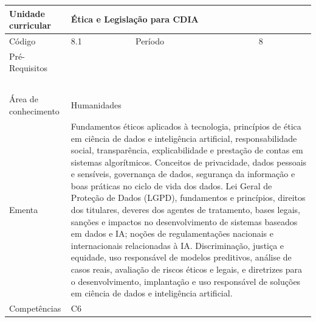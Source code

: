 \clearpage
\newpage

\begin{quadro}[ht!]
  \centering\scriptsize
\caption{Unidade Curricular Ética e Legislação para CDIA}

\begin{tabular}{|p{2.5cm}|p{2.5cm}|p{2.5cm}|p{2.5cm}|p{2.5cm}|}\hline

  Unidade curricular & \multicolumn{4}{p{10cm}|}{ Ética e Legislação para CDIA }\\\hline
  Código & 8.1 & Período & \multicolumn{2}{p{5cm}|}{ 8 }\\\hline
  Pré-Requisitos & \multicolumn{4}{p{10cm}|}{  } \\\hline
  \cellcolor{blue1}{ CH PRESENCIAL } &
    \cellcolor{blue1}{CH EAD Síncrona} &
    \cellcolor{blue1}{CH EAD Síncrona Mediada} &
    \cellcolor{blue1}{CH EAD Assíncrona} &
    \cellcolor{blue1}{CH APCC} \\\hline
  \cellcolor{blue1}{ 0 } &
    \cellcolor{blue1}{ 0 } &
    \cellcolor{blue1}{ 30 } &
    \cellcolor{blue1}{ 0 } &
    \cellcolor{blue1}{0} \\\hline
  \cellcolor{blue1}{ CH Teórica } &
    \cellcolor{blue1}{CH Prática} &
    \cellcolor{blue1}{CH Humanidades} &
    \cellcolor{blue1}{CH Extensão} &
    \cellcolor{blue1}{CH EAD TOTAL} \\\hline
  \cellcolor{blue1}{ 30 } &
    \cellcolor{blue1}{ 0 } &
    \cellcolor{blue1}{ 30 } &
    \cellcolor{blue1}{ 0 } &
    \cellcolor{blue1}{ 30 } \\\hline
  \cellcolor{blue1}{CARGA-HORÁRIA TOTAL} & \multicolumn{4}{p{10cm}|}{ \cellcolor{blue1}{ 30 } } \\\hline
  Área de conhecimento & \multicolumn{4}{p{10cm}|}{ Humanidades } \\\hline
  Ementa & \multicolumn{4}{p{10cm}|}{ Fundamentos éticos aplicados à tecnologia, princípios de ética em ciência de dados e inteligência artificial, responsabilidade social, transparência, explicabilidade e prestação de contas em sistemas algorítmicos. Conceitos de privacidade, dados pessoais e sensíveis, governança de dados, segurança da informação e boas práticas no ciclo de vida dos dados. Lei Geral de Proteção de Dados (LGPD), fundamentos e princípios, direitos dos titulares, deveres dos agentes de tratamento, bases legais, sanções e impactos no desenvolvimento de sistemas baseados em dados e IA; noções de regulamentações nacionais e internacionais relacionadas à IA. Discriminação, justiça e equidade, uso responsável de modelos preditivos, análise de casos reais, avaliação de riscos éticos e legais, e diretrizes para o desenvolvimento, implantação e uso responsável de soluções em ciência de dados e inteligência artificial. } \\\hline
  Competências & \multicolumn{4}{p{10cm}|}{ C6 } \\\hline


  
	\end{tabular}

\end{quadro}


\clearpage
\newpage

